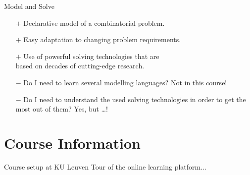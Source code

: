 \documentclass{cons-beamer}
\begin{document}
\begin{frame}{Model and Solve}
	
  \begin{itemize}
    \item[$+$] Declarative model of a combinatorial problem. \vfill
    \item[$+$] Easy adaptation to changing problem requirements. \vfill
    \item[$+$] Use of powerful solving technologies that are \\
    		   based on decades of cutting-edge research. \vfill
  \end{itemize}
  
  \begin{itemize}
    \item[$-$] Do I need to learn several modelling languages?
  	  		   \alert{Not in this course!} \vfill
    \item[$-$] Do I need to understand the used solving technologies in order to get the most out of them? 
  			   \alert{Yes, but \dots!} \vfill
  \end{itemize}
\end{frame}


\section{Course Information}

\begin{frame}{Course setup at KU Leuven}
Tour of the online learning platform...
\end{frame}
\end{document}
